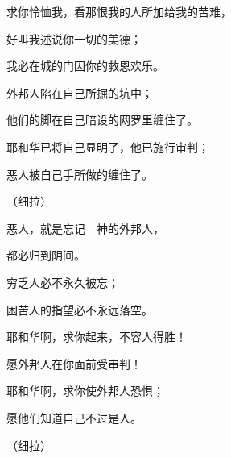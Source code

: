 {\par }{\Q 求你怜恤我，看那恨我的人所加给我的苦难，
\par }{\Q {}好叫我述说你一切的美德；
\par }{\Q 我必在{}城的门因你的救恩欢乐。
\par }{\BB \par }{\Q {}外邦人陷在自己所掘的坑中；
\par }{\Q 他们的脚在自己暗设的网罗里缠住了。
\par }{\Q {}耶和华已将自己显明了，他已施行审判；
\par }{\Q 恶人被自己手所做的缠住了。
\par }{\QS （细拉）
\par }
{\BB \par }{\Q {}恶人，就是忘记　神的外邦人，
\par }{\Q 都必归到阴间。
\par }{\Q {}穷乏人必不永久被忘；
\par }{\Q 困苦人的指望必不永远落空。
\par }{\BB \par }{\Q {}耶和华啊，求你起来，不容人得胜！
\par }{\Q 愿外邦人在你面前受审判！
\par }{\Q {}耶和华啊，求你使外邦人恐惧；
\par }{\Q 愿他们知道自己不过是人。
\par }{\QS （细拉）
\par }

